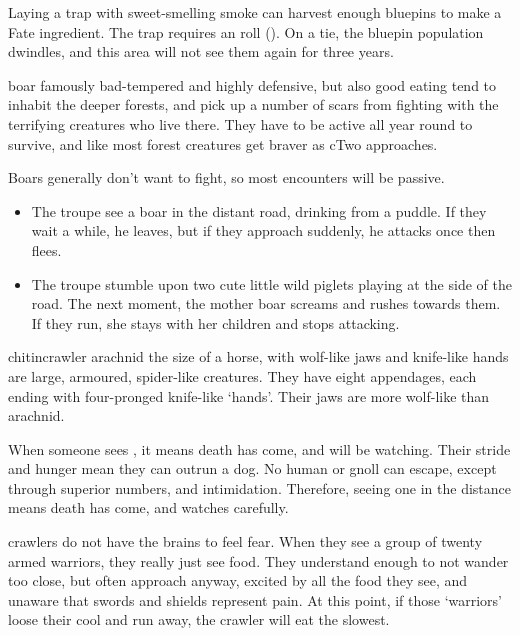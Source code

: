 \begin{multicols}{2}
Laying a trap with sweet-smelling smoke can harvest enough bluepins to make a Fate \gls{ingredient}.
The trap requires an  roll (\tn[12]).
On a tie, the bluepin population dwindles, and this area will not see them again for three years.

  {boar}%
  {famously bad-tempered and highly defensive, but also good eating}%
tend to inhabit the deeper forests, and pick up a number of scars from fighting with the terrifying creatures who live there.
They have to be active all year round to survive, and like most forest creatures get braver as \gls{cTwo} approaches.

\boar

\showEnc
Boars generally don't want to fight, so most encounters will be passive.

\begin{itemize}

  \item
  The troupe see a boar in the distant road, drinking from a puddle.
  If they wait a while, he leaves, but if they approach suddenly, he attacks once then flees.
  \item
  The troupe stumble upon two cute little wild piglets playing at the side of the road.
  The next moment, the mother boar screams and rushes towards them.
  If they run, she stays with her children and stops attacking.

\end{itemize}


  {chitincrawler}%
  {arachnid the size of a horse, with wolf-like jaws and knife-like hands}%
are large, armoured, spider-like creatures.
They have eight appendages, each ending with four-pronged knife-like `hands'.
Their jaws are more wolf-like than arachnid.

When someone sees , it means death has come, and will be watching.
Their stride and hunger mean they can outrun a dog.
No human or gnoll can escape, except through superior numbers, and intimidation.
Therefore, seeing one in the distance means death has come, and watches carefully.

\Glspl{crawler} do not have the brains to feel fear.
When they see a group of twenty armed warriors, they really just see food.
They understand enough to not wander too close, but often approach anyway, excited by all the food they see, and unaware that swords and shields represent pain.
At this point, if those `warriors' loose their cool and run away, the \gls{crawler} will eat the slowest.


\end{multicols}
